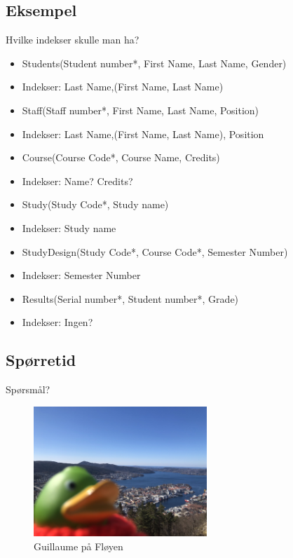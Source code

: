 \subsection*{Eksempel}
\begin{frame}{Hvilke indekser skulle man ha?}
    \begin{itemize}[<+->]
        \item Students(Student number*, First Name, Last Name, Gender)
        \item Indekser: Last Name,(First Name, Last Name)
        \item Staff(Staff number*, First Name, Last Name, Position)
        \item Indekser: Last Name,(First Name, Last Name), Position
        \item Course(Course Code*, Course Name, Credits)
        \item Indekser: Name? Credits?
        \item Study(Study Code*, Study name)
        \item Indekser: Study name
        \item StudyDesign(Study Code*, Course Code*, Semester Number)
        \item Indekser: Semester Number
        \item Results(Serial number*, Student number*, Grade)
        \item Indekser: Ingen?
    \end{itemize}
\end{frame}

\subsection*{Spørretid}
\begin{frame}{Spørsmål?}
    \begin{figure}
        \centering
        \includegraphics[height = 4.9cm]{images/guillaume10.jpg}
        \caption{Guillaume på Fløyen}
        \label{fig:guillaume10}
    \end{figure}
\end{frame}